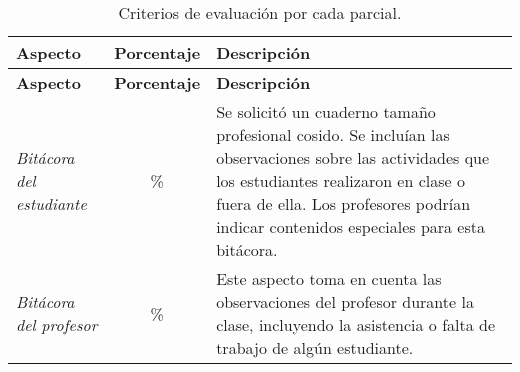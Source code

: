 \documentclass[spanish,]{book}
\begin{document}
\begin{longtable}[]{@{}lcl@{}}
\caption{\label{tab:Criterios} Criterios de evaluación por cada parcial.}\tabularnewline
\toprule
\begin{minipage}[b]{0.15\columnwidth}\raggedright
\textbf{Aspecto}\strut
\end{minipage} & \begin{minipage}[b]{0.14\columnwidth}\centering
\textbf{Porcentaje}\strut
\end{minipage} & \begin{minipage}[b]{0.63\columnwidth}\raggedright
\textbf{Descripción}\strut
\end{minipage}\tabularnewline
\midrule
\endfirsthead
\toprule
\begin{minipage}[b]{0.15\columnwidth}\raggedright
\textbf{Aspecto}\strut
\end{minipage} & \begin{minipage}[b]{0.14\columnwidth}\centering
\textbf{Porcentaje}\strut
\end{minipage} & \begin{minipage}[b]{0.63\columnwidth}\raggedright
\textbf{Descripción}\strut
\end{minipage}\tabularnewline
\midrule
\endhead
\begin{minipage}[t]{0.15\columnwidth}\raggedright
\emph{Bitácora del estudiante}\strut
\end{minipage} & \begin{minipage}[t]{0.14\columnwidth}\centering
20\%\strut
\end{minipage} & \begin{minipage}[t]{0.63\columnwidth}\raggedright
Se solicitó un cuaderno tamaño profesional cosido. Se incluían las observaciones sobre las actividades que los estudiantes realizaron en clase o fuera de ella. Los profesores podrían indicar contenidos especiales para esta bitácora.\strut
\end{minipage}\tabularnewline
\begin{minipage}[t]{0.15\columnwidth}\raggedright
\emph{Bitácora del profesor}\strut
\end{minipage} & \begin{minipage}[t]{0.14\columnwidth}\centering
20\%\strut
\end{minipage} & \begin{minipage}[t]{0.63\columnwidth}\raggedright
Este aspecto toma en cuenta las observaciones del profesor durante la clase, incluyendo la asistencia o falta de trabajo de algún estudiante.\strut
\end{minipage}\tabularnewline

\end{longtable}
\end{document}
